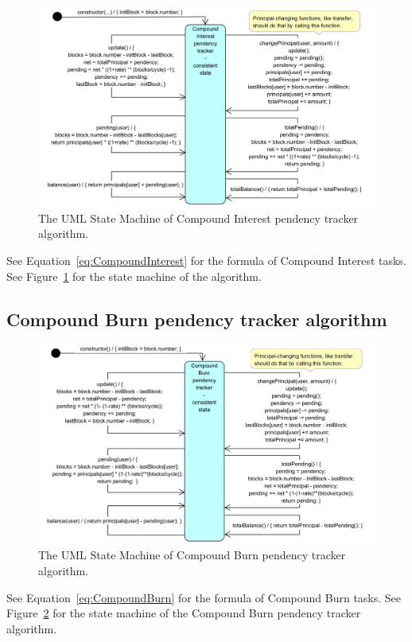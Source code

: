 \documentclass{article}
\begin{document}
\begin{figure}[H]
  \centering
  \includegraphics[width=5.3in]{images/CompoundInterestPendency.jpg}
  \caption{The UML State Machine of Compound Interest pendency tracker algorithm.
  }
  \label{fig:CompoundInterestPendency}
\end{figure}
See Equation~\ref{eq:CompoundInterest} for the formula of Compound Interest tasks.
See Figure~\ref{fig:CompoundInterestPendency} for the state machine of the 
algorithm.

\subsection{Compound Burn pendency tracker algorithm}
\label{sec:CompoundBurnPendency}

\begin{figure}[H]
  \centering
  \includegraphics[width=5.3in]{images/CompoundBurnPendency.jpg}
  \caption{The UML State Machine of Compound Burn pendency tracker algorithm.}
  \label{fig:CompoundBurnPendency}
\end{figure}
See Equation~\ref{eq:CompoundBurn} for the formula of Compound Burn tasks.
See Figure~\ref{fig:CompoundBurnPendency} for the state machine of the Compound 
Burn pendency tracker algorithm.
\end{document}
